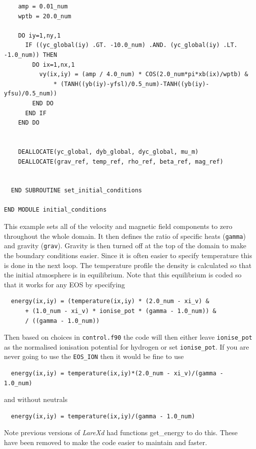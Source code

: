\documentclass[11pt]{article}
\begin{document}
\begin{verbatim}
    amp = 0.01_num
    wptb = 20.0_num

    DO iy=1,ny,1
      IF ((yc_global(iy) .GT. -10.0_num) .AND. (yc_global(iy) .LT. -1.0_num)) THEN
        DO ix=1,nx,1
          vy(ix,iy) = (amp / 4.0_num) * COS(2.0_num*pi*xb(ix)/wptb) &
              * (TANH((yb(iy)-yfsl)/0.5_num)-TANH((yb(iy)-yfsu)/0.5_num))
        END DO
      END IF
    END DO  


    DEALLOCATE(yc_global, dyb_global, dyc_global, mu_m)
    DEALLOCATE(grav_ref, temp_ref, rho_ref, beta_ref, mag_ref)


  END SUBROUTINE set_initial_conditions

END MODULE initial_conditions

\end{verbatim}

This example sets all of the velocity and magnetic field components to zero throughout the whole domain. It then defines the ratio of specific heats (\texttt{gamma}) and gravity (\texttt{grav}). Gravity is then turned off at the top of the domain to make the boundary conditions easier. Since it is often easier to specify temperature this is done in the next loop. The temperature profile the density is calculated so that the initial atmosphere is in equilibrium. Note that this equilibrium is coded so that it works for any EOS by specifying
\begin{verbatim}
  energy(ix,iy) = (temperature(ix,iy) * (2.0_num - xi_v) &
      + (1.0_num - xi_v) * ionise_pot * (gamma - 1.0_num)) &
      / ((gamma - 1.0_num))
\end{verbatim}
Then based on choices in \texttt{control.f90} the code will then either leave \texttt{ionise\_pot} as the normalised ionisation potential for hydrogen or set \texttt{ionise\_pot}. If you are never going to use the \texttt{EOS\_ION} then it would be fine to use
\begin{verbatim}
  energy(ix,iy) = temperature(ix,iy)*(2.0_num - xi_v)/(gamma - 1.0_num)
\end{verbatim}   
and without neutrals
\begin{verbatim}
  energy(ix,iy) = temperature(ix,iy)/(gamma - 1.0_num)
\end{verbatim} 
Note previous versions of {\it LareXd} had functions get\_energy to do this. These have been removed to make the code easier to maintain and faster.
\end{document}
